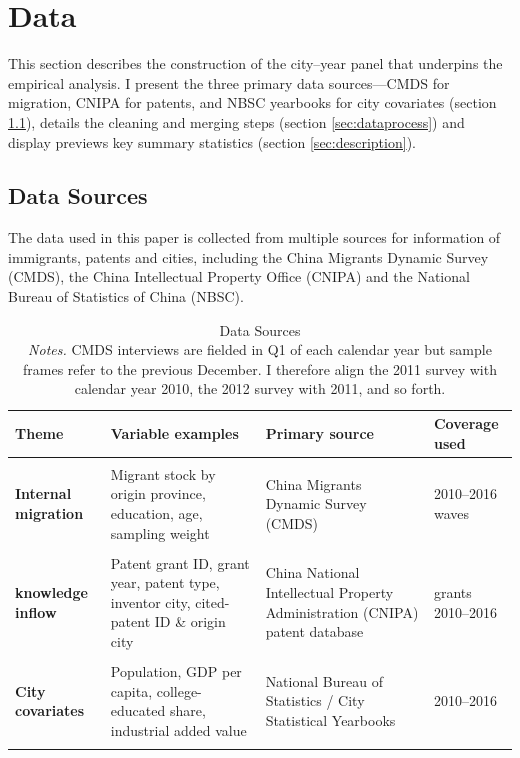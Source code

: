 \documentclass[12pt]{article}
\begin{document}
\section{Data} \label{sec:data}
This section describes the construction of the city--year panel that underpins the empirical analysis. I present the three primary data sources—CMDS for migration, CNIPA for patents, and NBSC yearbooks for city covariates (section \ref{sec:datasource}), details the cleaning and merging steps (section \ref{sec:dataprocess}) and display previews key summary statistics (section \ref{sec:description}).

\subsection{Data Sources}\label{sec:datasource}
The data used in this paper is collected from multiple sources for information of immigrants, patents and cities, including the China Migrants Dynamic Survey (CMDS), the China Intellectual Property Office (CNIPA) and the National Bureau of Statistics of China (NBSC).

\begin{table}[h]
\centering 
\resizebox{\textwidth}{!} {
\begin{tabular}{p{4cm} p{4cm} p{4cm} p{2cm}} \hline
 \textbf{Theme} & \textbf{Variable examples} & \textbf{Primary source} & \textbf{Coverage used} \\ \hline
 &  &  &  \\
 \textbf{Internal migration} &
        Migrant stock by origin province, education, age, sampling weight &
        China Migrants Dynamic Survey (CMDS) &
        2010--2016 waves \\
 &  &  &  \\
\textbf{knowledge inflow} &
        Patent grant ID, grant year, patent type, inventor city, cited-patent ID \& origin city &
        China National Intellectual Property Administration (CNIPA) patent database &
        grants 2010--2016 \\
 &  &  &  \\
\textbf{City covariates} &
        Population, GDP per capita, college-educated share, industrial added value &
        National Bureau of Statistics / City Statistical Yearbooks &
        2010--2016 \\
 &  &  &  \\
\hline
\end{tabular}}
\caption{Data Sources \vspace{1ex} \\ 
    {\footnotesize \emph{Notes.} CMDS interviews are fielded in Q1 of each calendar year but sample frames refer to the previous December. I therefore align the 2011 survey with calendar year 2010, the 2012 survey with 2011, and so forth.}}
\label{tab:data sources}
\end{table}
\end{document}
